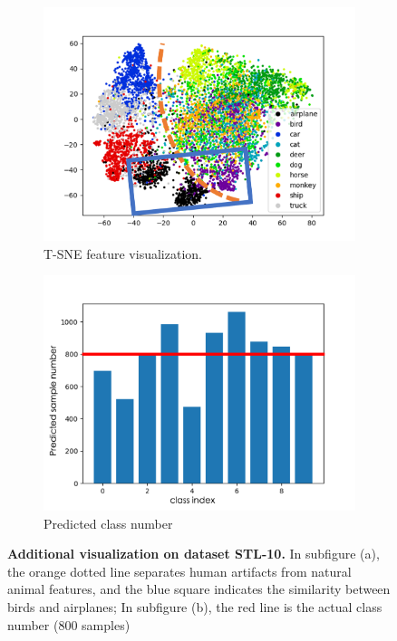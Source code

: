 \documentclass{article}
\begin{document}
\begin{figure}[hbt!]
     \centering
     \begin{subfigure}[b]{0.45\textwidth}
         \centering
         \includegraphics[width=\textwidth]{images/stl10_tsne.png}
         \caption{T-SNE feature visualization.}
         \label{fig:t_sne}
     \end{subfigure}
     \hfill
     \begin{subfigure}[b]{0.45\textwidth}
         \centering
         \includegraphics[width=\textwidth]{images/stl10.png}
         \caption{Predicted class number}
         \label{fig:distribution}
     \end{subfigure}
     \caption{\textbf{Additional visualization on dataset STL-10.} In subfigure (a), the orange dotted line separates human artifacts from natural animal features, and the blue square indicates the similarity between birds and airplanes; In subfigure (b), the red line is the actual class number (800 samples)}
     \label{fig:combine}
\end{figure}
\end{document}
